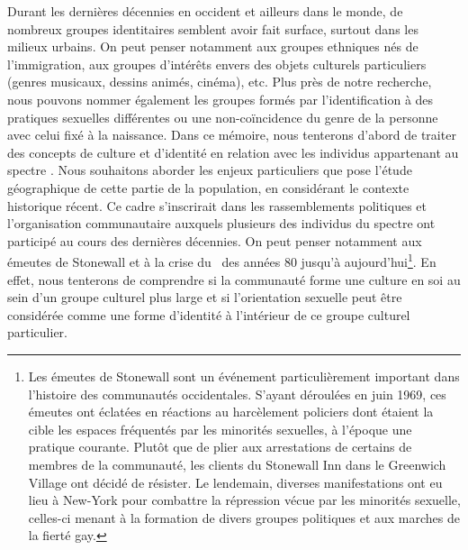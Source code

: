 Durant les dernières décennies en occident et ailleurs dans le monde, de nombreux groupes identitaires semblent avoir fait surface, surtout dans les milieux urbains.
On peut penser notamment aux groupes ethniques nés de l'immigration, aux groupes d'intérêts envers des objets culturels particuliers (genres musicaux, dessins animés, cinéma), etc.
Plus près de notre recherche, nous pouvons nommer également les groupes formés par l'identification à des pratiques sexuelles différentes ou une non-coïncidence du genre de la personne avec celui fixé à la naissance.
Dans ce mémoire, nous tenterons d'abord de traiter des concepts de culture et d'identité en relation avec les individus appartenant au spectre \lgbt{}.
Nous souhaitons aborder les enjeux particuliers que pose l'étude géographique de cette partie de la population, en considérant le contexte historique récent.
Ce cadre s'inscrirait dans les rassemblements politiques et l'organisation communautaire auxquels plusieurs des individus du spectre \lgbt{} ont participé au cours des dernières décennies.
On peut penser notamment aux émeutes de Stonewall et à la crise du \sida\ des années 80 jusqu'à aujourd'hui\footnote{Les émeutes de Stonewall sont un événement particulièrement important dans l'histoire des communautés \lgbt{} occidentales. 
  S'ayant déroulées en juin 1969, ces émeutes ont éclatées en réactions au harcèlement policiers dont étaient la cible les espaces fréquentés par les minorités sexuelles, à l'époque une pratique courante. 
  Plutôt que de plier aux arrestations de certains de membres de la communauté, les clients du Stonewall Inn dans le Greenwich Village ont décidé de résister. 
  Le lendemain, diverses manifestations ont eu lieu à New-York pour combattre la répression vécue par les minorités sexuelle, celles-ci menant à la formation de divers groupes politiques \lgbt{} et aux marches de la fierté gay.}.
En effet, nous tenterons de comprendre si la communauté \lgbt{} forme une culture en soi au sein d'un groupe culturel plus large et si l'orientation sexuelle peut être considérée comme une forme d'identité à l'intérieur de ce groupe culturel particulier.

